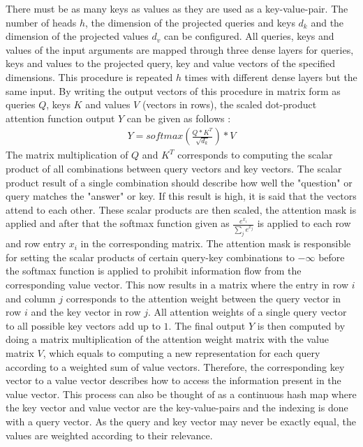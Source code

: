 \documentclass[draft,final]{vutinfth} %
\begin{document}
    There must be as many keys as values as they are used as a key-value-pair.
    The number of heads $h$, the dimension of the projected queries and keys $d_k$ and the dimension of the projected values $d_v$ can be configured.
    All queries, keys and values of the input arguments are mapped through three dense layers for queries, keys and values to the projected query, key and value vectors of the specified dimensions.
    This procedure is repeated $h$ times with different dense layers but the same input. 
    By writing the output vectors of this procedure in matrix form as queries $Q$, keys $K$ and values $V$ (vectors in rows), the scaled dot-product attention function output $Y$ can be given as follows \cite[p. 4]{Transformer}:
    \begin{align}
    \label{sdpa}
    Y = softmax \left( \frac{Q * K^T}{\sqrt{d_k}} \right) * V
    \end{align}
    The matrix multiplication of $Q$ and $K^T$ corresponds to computing the scalar product of all combinations between query vectors and key vectors.
    The scalar product result of a single combination should describe how well the "question" or query matches the "answer" or key.
    If this result is high, it is said that the vectors attend to each other.
    These scalar products are then scaled, the attention mask is applied and after that the softmax function given as $\frac{e^{x_i}}{\sum_j{e^{x_j}}}$ is applied to each row and row entry $x_i$ in the corresponding matrix.
    The attention mask is responsible for setting the scalar products of certain query-key combinations to $-\infty$ before the softmax function is applied to prohibit information flow from the corresponding value vector.
    This now results in a matrix where the entry in row $i$ and column $j$ corresponds to the attention weight between the query vector in row $i$ and the key vector in row $j$. 
    All attention weights of a single query vector to all possible key vectors add up to $1$.
    The final output $Y$ is then computed by doing a matrix multiplication of the attention weight matrix with the value matrix $V$, which equals to computing a new representation for each query according to a weighted sum of value vectors.
    Therefore, the corresponding key vector to a value vector describes how to access the information present in the value vector.
    This process can also be thought of as a continuous hash map where the key vector and value vector are the key-value-pairs and the indexing is done with a query vector.
    As the query and key vector may never be exactly equal, the values are weighted according to their relevance.
\end{document}
